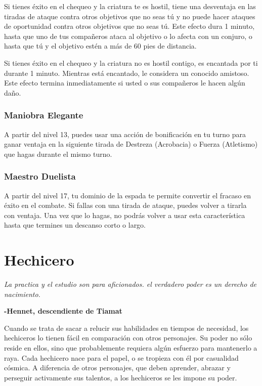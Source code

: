 \documentclass[a4paper,twocolumn,openany,10pt]{dndbook}
\begin{document}
Si tienes éxito en el chequeo y la criatura te es hostil, tiene una desventaja en las tiradas de ataque contra otros objetivos
que no seas tú y no puede hacer ataques de oportunidad contra otros objetivos que no seas tú. Este efecto dura 1 minuto, hasta
que uno de tus compañeros ataca al objetivo o lo afecta con un conjuro, o hasta que tú y el objetivo estén a más de 60 pies de
distancia.

Si tienes éxito en el chequeo y la criatura no es hostil contigo, es encantada por ti durante 1 minuto. Mientras está encantado,
le considera un conocido amistoso. Este efecto termina inmediatamente si usted o sus compañeros le hacen algún daño.

\subsubsection{Maniobra Elegante}
A partir del nivel 13, puedes usar una acción de bonificación en tu turno para ganar ventaja en la siguiente tirada de Destreza
(Acrobacia) o Fuerza (Atletismo) que hagas durante el mismo turno.

\subsubsection{Maestro Duelista}
A partir del nivel 17, tu dominio de la espada te permite convertir el fracaso en éxito en el combate. Si fallas con una tirada
de ataque, puedes volver a tirarla con ventaja. Una vez que lo hagas, no podrás volver a usar esta característica hasta que
termines un descanso corto o largo. 

\section{Hechicero}
\begin{quotebox}
	\textit{La practica y el estudio son para aficionados. el verdadero poder es un derecho de nacimiento.}

	\begin{flushright}
	\textbf{-Hennet, descendiente de Tiamat }
	\end{flushright}
\end{quotebox}

Cuando se trata de sacar a relucir sus habilidades en tiempos de necesidad, los hechiceros lo tienen fácil en comparación con
otros personajes. Su poder no sólo reside en ellos, sino que probablemente requiera algún esfuerzo para mantenerlo a raya. Cada
hechicero nace para el papel, o se tropieza con él por casualidad cósmica. A diferencia de otros personajes, que deben aprender,
abrazar y perseguir activamente sus talentos, a los hechiceros se les impone su poder.
\end{document}
